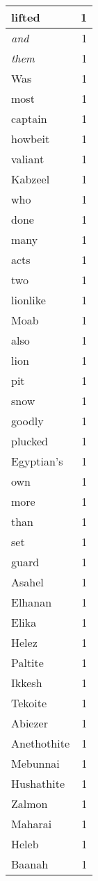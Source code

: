 \begin{center}
\begin{longtable}{l|r}
lifted & 1 \\ \hline
\emph{and} & 1 \\ \hline
\emph{them} & 1 \\ \hline
Was & 1 \\ \hline
most & 1 \\ \hline
captain & 1 \\ \hline
howbeit & 1 \\ \hline
valiant & 1 \\ \hline
Kabzeel & 1 \\ \hline
who & 1 \\ \hline
done & 1 \\ \hline
many & 1 \\ \hline
acts & 1 \\ \hline
two & 1 \\ \hline
lionlike & 1 \\ \hline
Moab & 1 \\ \hline
also & 1 \\ \hline
lion & 1 \\ \hline
pit & 1 \\ \hline
snow & 1 \\ \hline
goodly & 1 \\ \hline
plucked & 1 \\ \hline
Egyptian's & 1 \\ \hline
own & 1 \\ \hline
more & 1 \\ \hline
than & 1 \\ \hline
set & 1 \\ \hline
guard & 1 \\ \hline
Asahel & 1 \\ \hline
Elhanan & 1 \\ \hline
Elika & 1 \\ \hline
Helez & 1 \\ \hline
Paltite & 1 \\ \hline
Ikkesh & 1 \\ \hline
Tekoite & 1 \\ \hline
Abiezer & 1 \\ \hline
Anethothite & 1 \\ \hline
Mebunnai & 1 \\ \hline
Hushathite & 1 \\ \hline
Zalmon & 1 \\ \hline
Maharai & 1 \\ \hline
Heleb & 1 \\ \hline
Baanah & 1 \\ \hline

\end{longtable}
\end{center}

